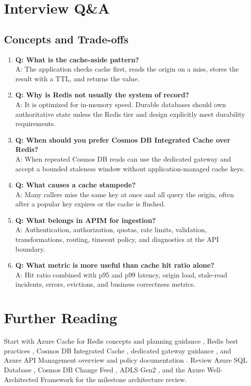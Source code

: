 \section{Interview Q\&A}
\subsection{Concepts and Trade-offs}
\begin{enumerate}
    \item \textbf{Q: What is the cache-aside pattern?}\\
    A: The application checks cache first, reads the origin on a miss, stores the result with a TTL, and returns the value.
    \item \textbf{Q: Why is Redis not usually the system of record?}\\
    A: It is optimized for in-memory speed. Durable databases should own authoritative state unless the Redis tier and design explicitly meet durability requirements.
    \item \textbf{Q: When should you prefer Cosmos DB Integrated Cache over Redis?}\\
    A: When repeated Cosmos DB reads can use the dedicated gateway and accept a bounded staleness window without application-managed cache keys.
    \item \textbf{Q: What causes a cache stampede?}\\
    A: Many callers miss the same key at once and all query the origin, often after a popular key expires or the cache is flushed.
    \item \textbf{Q: What belongs in APIM for ingestion?}\\
    A: Authentication, authorization, quotas, rate limits, validation, transformations, routing, timeout policy, and diagnostics at the API boundary.
    \item \textbf{Q: What metric is more useful than cache hit ratio alone?}\\
    A: Hit ratio combined with p95 and p99 latency, origin load, stale-read incidents, errors, evictions, and business correctness metrics.
\end{enumerate}

\section{Further Reading}
Start with Azure Cache for Redis concepts and planning guidance \cite{microsoft2025azureCacheRedis}, Redis best practices \cite{microsoft2025azureCacheRedisBestPractices}, Cosmos DB Integrated Cache \cite{microsoft2025cosmosIntegratedCache}, dedicated gateway guidance \cite{microsoft2025cosmosDedicatedGateway}, and Azure API Management overview and policy documentation \cite{microsoft2025apimOverview,microsoft2025apimPolicies}. Review Azure SQL Database \cite{microsoft2025azuresqldb}, Cosmos DB Change Feed \cite{microsoft2025cosmosChangeFeed}, ADLS Gen2 \cite{microsoft2025adlsgen2}, and the Azure Well-Architected Framework \cite{microsoft2025wellarchitected} for the milestone architecture review.

